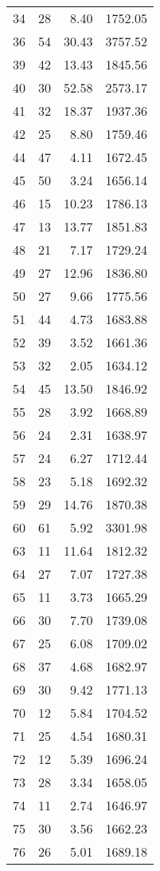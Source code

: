 \begin{appendix}
\begin{longtable}{rrrr}
34 & 28 & 8.40 & 1752.05 \\
36 & 54 & 30.43 & 3757.52 \\
39 & 42 & 13.43 & 1845.56 \\
40 & 30 & 52.58 & 2573.17 \\
41 & 32 & 18.37 & 1937.36 \\
42 & 25 & 8.80 & 1759.46 \\
44 & 47 & 4.11 & 1672.45 \\
45 & 50 & 3.24 & 1656.14 \\
46 & 15 & 10.23 & 1786.13 \\
47 & 13 & 13.77 & 1851.83 \\
48 & 21 & 7.17 & 1729.24 \\
49 & 27 & 12.96 & 1836.80 \\
50 & 27 & 9.66 & 1775.56 \\
51 & 44 & 4.73 & 1683.88 \\
52 & 39 & 3.52 & 1661.36 \\
53 & 32 & 2.05 & 1634.12 \\
54 & 45 & 13.50 & 1846.92 \\
55 & 28 & 3.92 & 1668.89 \\
56 & 24 & 2.31 & 1638.97 \\
57 & 24 & 6.27 & 1712.44 \\
58 & 23 & 5.18 & 1692.32 \\
59 & 29 & 14.76 & 1870.38 \\
60 & 61 & 5.92 & 3301.98 \\
63 & 11 & 11.64 & 1812.32 \\
64 & 27 & 7.07 & 1727.38 \\
65 & 11 & 3.73 & 1665.29 \\
66 & 30 & 7.70 & 1739.08 \\
67 & 25 & 6.08 & 1709.02 \\
68 & 37 & 4.68 & 1682.97 \\
69 & 30 & 9.42 & 1771.13 \\
70 & 12 & 5.84 & 1704.52 \\
71 & 25 & 4.54 & 1680.31 \\
72 & 12 & 5.39 & 1696.24 \\
73 & 28 & 3.34 & 1658.05 \\
74 & 11 & 2.74 & 1646.97 \\
75 & 30 & 3.56 & 1662.23 \\
76 & 26 & 5.01 & 1689.18 \\
\bottomrule
\end{longtable}

\end{appendix}
